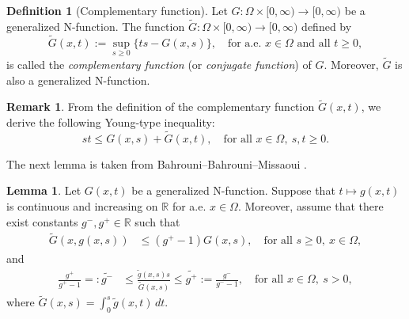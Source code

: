 \documentclass[10pt,reqno]{amsart}
\newcommand *\w{^\wedge}
\theoremstyle{definition}
\newtheorem{lemma}[theorem]{Lemma}
\newtheorem{definition}[theorem]{Definition}
\newtheorem{remark}[theorem]{Remark}
\numberwithin{equation}{section}
\begin{document}
\begin{definition}[Complementary function]\label{CF}
Let $G:\Omega\times[0,\infty)\to[0,\infty)$ be a generalized $\mathrm{N}$-function.
The function $\widetilde{G}:\Omega\times[0,\infty)\to[0,\infty)$ defined by
\begin{equation}\label{Cf}
\widetilde{G}(x,t)
:= \sup_{s \ge 0} \bigl\{ ts - G(x,s) \bigr\},
\quad \text{for a.e.\ } x\in\Omega \text{ and all } t\ge 0,
\end{equation}
is called the \emph{complementary function} (or \emph{conjugate function}) of $G$.
Moreover, $\widetilde{G}$ is also a generalized $\mathrm{N}$-function.
\end{definition}


\begin{remark}
From the definition of the complementary function $\widetilde{G}(x,t)$, we derive the following Young-type inequality:
\begin{equation}\label{Yi}
st \leq G(x,s) + \widetilde{G}(x,t), \quad \text{for all } x \in \Omega, \ s,t \geq 0.
\end{equation}
\end{remark}

The next lemma is taken from Bahrouni--Bahrouni--Missaoui \cite[Lemma~2.3]{Ala1}.

\begin{lemma}\label{lm1}
Let $G(x,t)$ be a generalized \textnormal{N}-function. Suppose that $t \mapsto g(x,t)$ is continuous and increasing on $\mathbb{R}$ for a.e. $x \in \Omega$. Moreover, assume that there exist constants $g^-, g^+ \in \mathbb{R}$ such that
\begin{align}
\widetilde{G}(x, g(x,s)) &\leq (g^+ - 1) G(x,s), \quad \text{for all } s \geq 0, \ x \in \Omega, \label{L1} \end{align}
and
\begin{align}
\frac{g^+}{g^+ - 1} =: \widetilde{g^-} &\leq \frac{\widetilde{g}(x,s)s}{\widetilde{G}(x,s)} \leq \widetilde{g^+} := \frac{g^-}{g^- - 1}, \quad \text{for all } x \in \Omega, \ s > 0, \label{D3}
\end{align}
where $\displaystyle \widetilde{G}(x,s) = \int_0^s \widetilde{g}(x,t)\, dt$.
\end{lemma}
\end{document}
